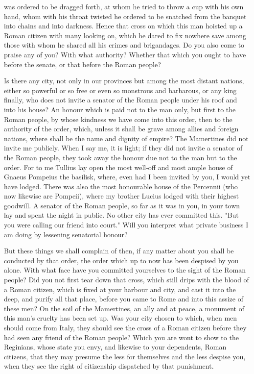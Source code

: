  was ordered to be dragged forth, at whom he tried to throw a cup with his own hand, whom with his throat twisted he ordered to be snatched from the banquet into chains and into darkness. Hence that cross on which this man hoisted up a Roman citizen with many looking on, which he dared to fix nowhere save among those with whom he shared all his crimes and brigandages. Do you also come to praise any of you? With what authority? Whether that which you ought to have before the senate, or that before the Roman people?

 Is there any city, not only in our provinces but among the most distant nations, either so powerful or so free or even so monstrous and barbarous, or any king finally, who does not invite a senator of the Roman people under his roof and into his house? An honour which is paid not to the man only, but first to the Roman people, by whose kindness we have come into this order, then to the authority of the order, which, unless it shall be grave among allies and foreign nations, where shall be the name and dignity of empire? The Mamertines did not invite me publicly. When I say me, it is light; if they did not invite a senator of the Roman people, they took away the honour due not to the man but to the order. For to me Tullius lay open the most well-off and most ample house of Gnaeus Pompeius the basilisk, where, even had I been invited by you, I would yet have lodged. There was also the most honourable house of the Percennii (who now likewise are Pompeii), where my brother Lucius lodged with their highest goodwill. A senator of the Roman people, so far as it was in you, in your town lay and spent the night in public. No other city has ever committed this. "But you were calling our friend into court." Will you interpret what private business I am doing by lessening senatorial honour?

 But these things we shall complain of then, if any matter about you shall be conducted by that order, the order which up to now has been despised by you alone. With what face have you committed yourselves to the sight of the Roman people? Did you not first tear down that cross, which still drips with the blood of a Roman citizen, which is fixed at your harbour and city, and cast it into the deep, and purify all that place, before you came to Rome and into this assize of these men? On the soil of the Mamertines, an ally and at peace, a monument of this man's cruelty has been set up. Was your city chosen to which, when men should come from Italy, they should see the cross of a Roman citizen before they had seen any friend of the Roman people? Which you are wont to show to the Reginians, whose state you envy, and likewise to your dependents, Roman citizens, that they may presume the less for themselves and the less despise you, when they see the right of citizenship dispatched by that punishment.

